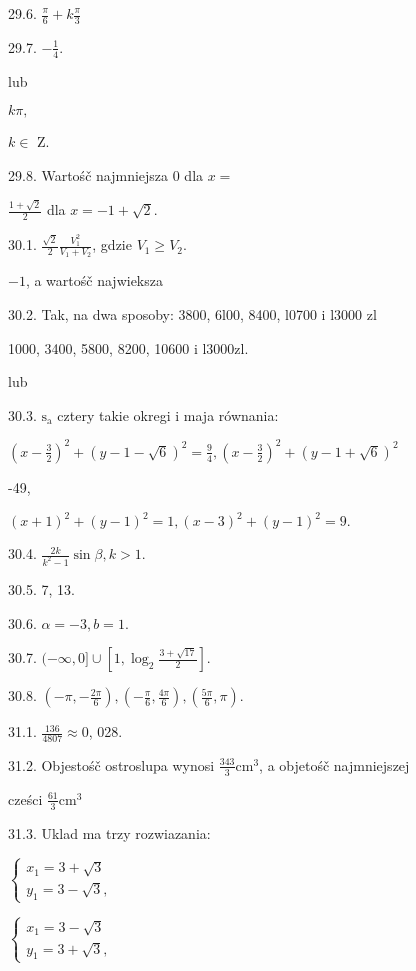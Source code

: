 \documentclass[a4paper,12pt]{article}
\begin{document}
29.6. $\displaystyle \frac{\pi}{6}+k\frac{\pi}{3}$

29.7. $-\displaystyle \frac{1}{4}.$

lub

$k\pi,$

$ k\in$ Z.

29.8. Wartośč najmniejsza 0 dla $x =$

$\displaystyle \frac{1+\sqrt{2}}{2}$ dla $x=-1+\sqrt{2}.$

30.1. $\displaystyle \frac{\sqrt{2}}{2}\frac{V_{1}^{2}}{V_{1}+V_{2}}$, gdzie $V_{1}\geq V_{2}.$

$-1$, a wartośč najwieksza

30.2. Tak, na dwa sposoby: 3800, 6l00, 8400, l0700 i l3000 zl

1000, 3400, 5800, 8200, 10600 i l3000zl.

lub

30.3. $\mathrm{s}_{\mathrm{a}}$ cztery takie okregi $\mathrm{i}$ maja równania:

$(x-\displaystyle \frac{3}{2})^{2} + (y-1-\sqrt{6})^{2} = \displaystyle \frac{9}{4}, (x-\displaystyle \frac{3}{2})^{2} + (y-1+\sqrt{6})^{2}$

-49,

$(x+1)^{2}+(y-1)^{2}=1, (x-3)^{2}+(y-1)^{2}=9.$

30.4. $\displaystyle \frac{2k}{k^{2}-1}\sin\beta, k>1.$

30.5. 7, 13.

30.6. $\alpha=-3, b=1.$

30.7. $(-\infty,0]\cup [1,\displaystyle \log_{2}\frac{3+\sqrt{17}}{2}].$

30.8. $(-\displaystyle \pi,-\frac{2\pi}{6}), (-\displaystyle \frac{\pi}{6},\frac{4\pi}{6}), (\displaystyle \frac{5\pi}{6},\pi).$

31.1. $\displaystyle \frac{136}{4807}\approx 0$, 028.

31.2. Objestośč ostroslupa wynosi $\displaystyle \frac{343}{3} \mathrm{c}\mathrm{m}^{3}$, a objetośč najmniejszej

cześci $\displaystyle \frac{61}{3}\mathrm{c}\mathrm{m}^{3}$

31.3. Uklad ma trzy rozwiazania:

$\left\{\begin{array}{l}
x_{1}=3+\sqrt{3}\\
y_{1}=3-\sqrt{3},
\end{array}\right.$

$\left\{\begin{array}{l}
x_{1}=3-\sqrt{3}\\
y_{1}=3+\sqrt{3},
\end{array}\right.$
\end{document}
